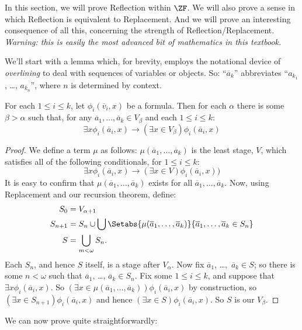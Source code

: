 \documentclass[../../../include/open-logic-section]{subfiles}
\begin{document}

In this section, we will prove Reflection within $\ZF$. We will also
prove a sense in which Reflection is equivalent to Replacement. And we
will prove an interesting consequence of all this, concerning the
strength of Reflection/Replacement. \emph{Warning: this is easily the
most advanced bit of mathematics in this textbook.} 

We'll start with a lemma which, for brevity, employs the notational
device of \emph{overlining} to deal with sequences of variables or
objects. So: ``$\overline{a}_k$'' abbreviates ``$a_{k_1}$, \dots,
$a_{k_n}$'', where $n$ is determined by context.

\begin{lem}
For each $1 \leq i \leq k$, let $\phi_i(\overline{v}_i, x)$ be a
formula. Then for each $\alpha$
there is some $\beta > \alpha$ such that, for any $\overline{a}_1,
\ldots, \overline{a}_k \in V_\beta$ and each $1 \leq i \leq k$:
\[
	\exists x\phi_i(\overline{a}_i, x) \rightarrow (\exists x \in V_\beta) \phi_i(\overline{a}_i, x)
\]
\end{lem}

\begin{proof}
We define a term $\mu$ as follows: $\mu(\overline{a}_1, \ldots,
\overline{a}_k)$ is the least stage, $V$, which satisfies all of the
following conditionals, for $1 \leq i \leq k$:
\[
\exists x\phi_i(\overline{a}_i, x) \rightarrow (\exists x \in V) \phi_i(\overline{a}_i, x))
\]
It is easy to confirm that $\mu(\overline{a}_1, \ldots, \overline{a}_k)$ exists for all $\overline{a}_1, \ldots, \overline{a}_k$. Now, using Replacement and our recursion theorem, define:
\begin{align*}
	S_0 & = V_{\alpha+1}\\
	S_{n+1} & = S_n \cup \bigcup
	\Setabs{\mu(\overline{a}_1, \ldots, \overline{a}_k)}
	{\overline{a}_1, \ldots, \overline{a}_k \in S_n} \\
	S &= \bigcup_{m < \omega} S_n.
\end{align*}
Each $S_n$, and hence $S$ itself, is a stage after $V_\alpha$. Now fix
$\overline{a}_1$, \dots,~$\overline{a}_k \in S$; so there is some $n <
\omega$ such that $\overline{a}_1$, \dots, $\overline{a}_k \in S_n$.
Fix some $1 \leq i \leq k$, and suppose that $\exists x
\phi_i(\overline{a}_i,x)$. So $(\exists x \in \mu(\overline{a}_1,
\ldots, \overline{a}_k))\phi_i(\overline{a}_i, x)$ by construction, so
$(\exists x \in S_{n+1})\phi_i(\overline{a}_i, x)$ and hence
$(\exists x \in S)\phi_i(\overline{a}_i, x)$. So $S$ is our $V_\beta$.
\end{proof}
\noindent 
We can now prove  quite
straightforwardly:
\end{document}
